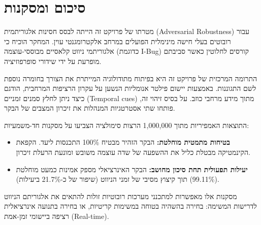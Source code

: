 \documentclass[12pt, a4paper]{article}
\begin{document}
\section{סיכום ומסקנות}
מטרתו של פרויקט זה הייתה לבסס חסינות אלגוריתמית (\textenglish{Adversarial Robustness}) עבור רובוטים בעלי חישה מינימלית הפועלים במרחב אלקטרומגנטי עוין. המחקר הוכיח כי אלגוריתמי ניווט קלאסיים מבוססי-עוצמה (כדוגמת \textenglish{I-Bug}) קורסים לחלוטין כאשר סביבתם מופרעת על ידי שידורי סופרפוזיציה.

התרומה המרכזית של פרויקט זה היא בפיתוח מתודולוגיה המייתרת את הצורך בחומרה נוספת לשם התגוננות. באמצעות יישום פילטר אנומליות הנשען על עקרון הרציפות המרחבית, הודגם כיצד ניתן לחלץ סמנים זמניים (\textenglish{Temporal cues}) מתוך מידע מרחבי כוזב. על בסיס זיהוי זה, פותחו שתי אסטרטגיות המנהלות את זיכרון המצבים של הבקר.

התוצאות האמפיריות מתוך 1,000,000 הרצות סימולציה הצביעו על מסקנות חד-משמעיות:
\begin{itemize}
    \item \textbf{בטיחות מתמטית מוחלטת:} הבקר הזהיר מבטיח 100\% התכנסות ליעד. הקפאת הקינמטיקה מבטלת כליל את ההשפעה של שדה עוצמה משובש ומונעת הרעלת זיכרון.
    \item \textbf{יעילות תפעולית תחת סיכון מחושב:} הבקר האינרציאלי מספק אמינות כמעט מוחלטת (99.11\%) תוך קיצוץ מסיבי של זמני הניווט (שיפור של כ-21.7\% ביעילות). 
\end{itemize}

מסקנות אלו מאפשרות למתכנני מערכות רובוטיות זולות להתאים את אלגוריתם הניווט לדרישות המשימה: בחירה בהשהיה בטוחה במשימות קריטיות, או בחירה בתנועה אינרציאלית רציפה ביישומי זמן-אמת (\textenglish{Real-time}). 
\end{document}
